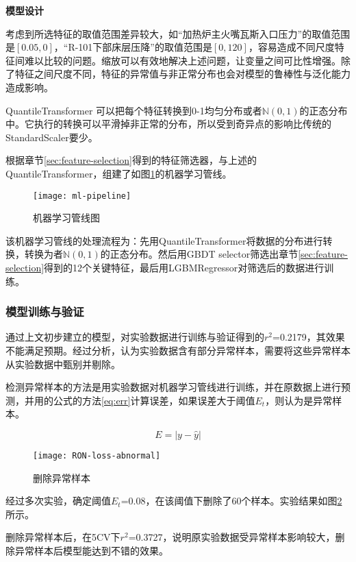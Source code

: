\documentclass[bwprint]{gmcmthesis}
\begin{document}
\textbf{模型设计}


考虑到所选特征的取值范围差异较大，如“加热炉主火嘴瓦斯入口压力”的取值范围是$[0.05, 0]$，“R-101下部床层压降”的取值范围是$[0, 120]$，容易造成不同尺度特征间难以比较的问题。缩放可以有效地解决上述问题，让变量之间可比性增强。除了特征之间尺度不同，特征的异常值与非正常分布也会对模型的鲁棒性与泛化能力造成影响。

QuantileTransformer 可以把每个特征转换到0-1均匀分布或者$\mathbb{N}(0,1)$的正态分布中。它执行的转换可以平滑掉非正常的分布，所以受到奇异点的影响比传统的StandardScaler要少。


根据章节\ref{sec:feature-selection}得到的特征筛选器，与上述的QuantileTransformer，组建了如图\ref{img:ml-pipeline}的机器学习管线。

\begin{figure}[htb]
	\centering
	\texttt{[image: ml-pipeline]}
	\caption{机器学习管线图}
	\label{img:ml-pipeline}
\end{figure}

该机器学习管线的处理流程为：先用QuantileTransformer将数据的分布进行转换，转换为者$\mathbb{N}(0,1)$的正态分布。然后用GBDT selector筛选出章节\ref{sec:feature-selection}得到的12个关键特征，最后用LGBMRegressor对筛选后的数据进行训练。

\FloatBarrier
\subsubsection{模型训练与验证}

通过上文初步建立的模型，对实验数据进行训练与验证得到的$r^2$=0.2179，其效果不能满足预期。经过分析，认为实验数据含有部分异常样本，需要将这些异常样本从实验数据中甄别并剔除。

检测异常样本的方法是用实验数据对机器学习管线进行训练，并在原数据上进行预测，并用的公式的方法\ref{eq:err}计算误差，如果误差大于阈值$E_t$，则认为是异常样本。

\begin{equation}\label{eq:err}
	E=|y-\hat{y}|
\end{equation}


\begin{figure}[htb]
	\centering
	\texttt{[image: RON-loss-abnormal]}
	\caption{删除异常样本}
	\label{img:abnormal}
\end{figure}

经过多次实验，确定阈值$E_t$=0.08，在该阈值下删除了60个样本。实验结果如图\ref{img:abnormal}所示。

删除异常样本后，在5CV下$r^2$=0.3727，说明原实验数据受异常样本影响较大，删除异常样本后模型能达到不错的效果。
\end{document}
